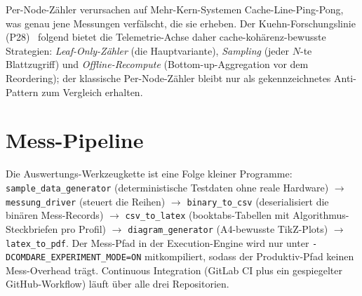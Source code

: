 Per-Node-Zähler verursachen auf Mehr-Kern-Systemen Cache-Line-Ping-Pong, was genau jene Messungen
verfälscht, die sie erheben. Der Kuehn-Forschungslinie (P28)~\cite{kuehn2023bplustree} folgend
bietet die Telemetrie-Achse daher cache-kohärenz-bewusste Strategien: \emph{Leaf-Only-Zähler} (die
Hauptvariante), \emph{Sampling} (jeder $N$-te Blattzugriff) und \emph{Offline-Recompute}
(Bottom-up-Aggregation vor dem Reordering); der klassische Per-Node-Zähler bleibt nur als
gekennzeichnetes Anti-Pattern zum Vergleich erhalten.

\section{Mess-Pipeline}\label{sec:pipeline}

Die Auswertungs-Werkzeugkette ist eine Folge kleiner Programme: \texttt{sample\_data\_generator}
(deterministische Testdaten ohne reale Hardware) $\rightarrow$ \texttt{messung\_driver} (steuert die
Reihen) $\rightarrow$ \texttt{binary\_to\_csv} (deserialisiert die binären Mess-Records)
$\rightarrow$ \texttt{csv\_to\_latex} (booktabs-Tabellen mit Algorithmus-Steckbriefen pro Profil)
$\rightarrow$ \texttt{diagram\_generator} (A4-bewusste TikZ-Plots) $\rightarrow$
\texttt{latex\_to\_pdf}. Der Mess-Pfad in der Execution-Engine wird nur unter
\texttt{-DCOMDARE\_\allowbreak{}EXPERIMENT\_\allowbreak{}MODE=ON} mitkompiliert, sodass der
Produktiv-Pfad keinen Mess-Overhead trägt. Continuous Integration (GitLab CI plus ein gespiegelter
GitHub-Workflow) läuft über alle drei Repositorien.
